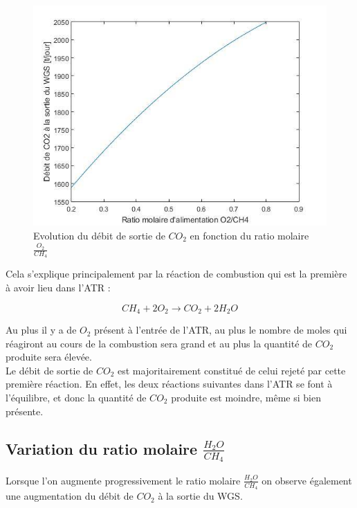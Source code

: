 \documentclass[12pt]{report}
\begin{document}
\begin{figure}[H]
\begin{center}
\includegraphics[scale=0.6]{debit_CO2_ratio_O2}
\caption{Evolution du débit de sortie de $CO_2$ en fonction du ratio molaire $\frac{O_2}{CH_4}$}
\end{center}
\end{figure}

Cela s'explique principalement par la réaction de combustion qui est la première à avoir lieu dans l'ATR :

\begin{equation}
 CH_4 + 2O_2 \rightarrow CO_2 + 2H_2O
\end{equation}

Au plus il y a de $O_2$ présent à l'entrée de l'ATR, au plus le nombre de moles qui réagiront au cours de la combustion sera grand et au plus la quantité de $CO_2$ produite sera élevée.\\
Le débit de sortie de $CO_2$ est majoritairement constitué de celui rejeté par cette première réaction. En effet, les deux réactions suivantes dans l'ATR se font à l'équilibre, et donc la quantité de $CO_2$ produite est moindre, même si bien présente.\\ 


\subsection{Variation du ratio molaire $\frac{H_2O}{CH_4}$}

Lorsque l'on augmente progressivement le ratio molaire $\frac{H_2O}{CH_4}$ on observe également une augmentation du débit de $CO_2$ à la sortie du WGS.\\
\end{document}
